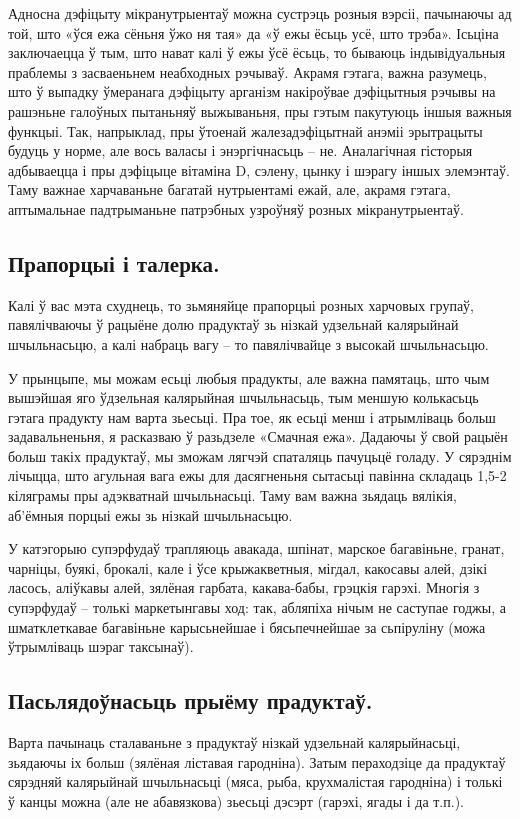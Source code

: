 Адносна дэфіцыту мікранутрыентаў можна сустрэць розныя вэрсіі, пачынаючы ад той, што «ўся ежа сёньня ўжо ня тая» да «ў ежы ёсьць усё, што трэба». Ісьціна заключаецца ў тым, што нават калі ў ежы ўсё ёсьць, то бываюць індывідуальныя праблемы з засваеньнем неабходных рэчываў. Акрамя гэтага, важна разумець, што ў выпадку ўмеранага дэфіцыту арганізм накіроўвае дэфіцытныя рэчывы на рашэньне галоўных пытаньняў выжываньня, пры гэтым пакутуюць іншыя важныя функцыі. Так, напрыклад, пры ўтоенай жалезадэфіцытнай анэміі эрытрацыты будуць у норме, але вось валасы і энэргічнасьць – не. Аналагічная гісторыя адбываецца і пры дэфіцыце вітаміна D, сэлену, цынку і шэрагу іншых элемэнтаў. Таму важнае харчаваньне багатай нутрыентамі ежай, але, акрамя гэтага, аптымальнае падтрыманьне патрэбных узроўняў розных мікранутрыентаў.

\subsection{Прапорцыі і талерка.}
Калі ў вас мэта схуднець, то зьмяняйце прапорцыі розных харчовых групаў, павялічваючы ў рацыёне долю прадуктаў зь нізкай удзельнай калярыйнай шчыльнасьцю, а калі набраць вагу – то павялічвайце з высокай шчыльнасьцю.

У прынцыпе, мы можам есьці любыя прадукты, але важна памятаць, што чым вышэйшая яго ўдзельная калярыйная шчыльнасьць, тым меншую колькасьць гэтага прадукту нам варта зьесьці. Пра тое, як есьці менш і атрымліваць больш задавальненьня, я расказваю ў разьдзеле «Смачная ежа». Дадаючы ў свой рацыён больш такіх прадуктаў, мы зможам лягчэй спаталяць пачуцьцё голаду. У сярэднім лічыцца, што агульная вага ежы для дасягненьня сытасьці павінна складаць 1,5-2 кіляграмы пры адэкватнай шчыльнасьці. Таму вам важна зьядаць вялікія, аб'ёмныя порцыі ежы зь нізкай шчыльнасьцю.

У катэгорыю супэрфудаў трапляюць авакада, шпінат, марское багавіньне, гранат, чарніцы, буякі, брокалі, кале і ўсе крыжакветныя, мігдал, какосавы алей, дзікі ласось, аліўкавы алей, зялёная гарбата, какава-бабы, грэцкія гарэхі. Многія з супэрфудаў – толькі маркетынгавы ход: так, абляпіха нічым не саступае годжы, а шматклеткавае багавіньне карысьнейшае і бясьпечнейшае за сьпіруліну (можа ўтрымліваць шэраг таксынаў).

\subsection{Пасьлядоўнасьць прыёму прадуктаў.}
Варта пачынаць сталаваньне з прадуктаў нізкай удзельнай калярыйнасьці, зьядаючы іх больш (зялёная ліставая гародніна). Затым пераходзіце да прадуктаў сярэдняй калярыйнай шчыльнасьці (мяса, рыба, крухмалістая гародніна) і толькі ў канцы можна (але не абавязкова) зьесьці дэсэрт (гарэхі, ягады і да т.п.).

